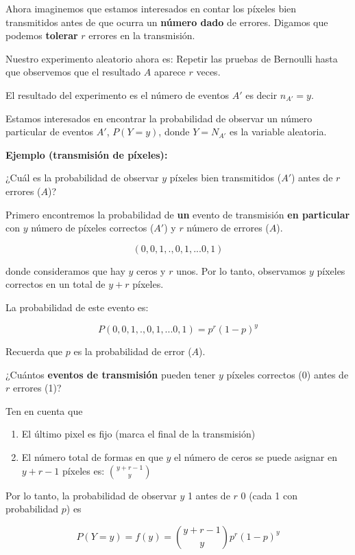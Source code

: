 \documentclass[
]{book}
\begin{document}
Ahora imaginemos que estamos interesados en contar los píxeles bien transmitidos antes de que ocurra un \textbf{número dado} de errores. Digamos que podemos \textbf{tolerar} \(r\) errores en la transmisión.

Nuestro experimento aleatorio ahora es: Repetir las pruebas de Bernoulli hasta que observemos que el resultado \(A\) aparece \(r\) veces.

El resultado del experimento es el número de eventos \(A'\) es decir \(n_{A'}=y\).

Estamos interesados en encontrar la probabilidad de observar un número particular de eventos \(A'\), \(P(Y=y)\), donde \(Y=N_{A'}\) es la variable aleatoria.

\textbf{Ejemplo (transmisión de píxeles):}

¿Cuál es la probabilidad de observar \(y\) píxeles bien transmitidos (\(A'\)) antes de \(r\) errores (\(A\))?

Primero encontremos la probabilidad de \textbf{un} evento de transmisión \textbf{en particular} con \(y\) número de píxeles correctos (\(A'\)) y \(r\) número de errores (\(A\)).

\[(0,0,1,., 0,1,...0,1)\]

donde consideramos que hay \(y\) ceros y \(r\) unos. Por lo tanto, observamos \(y\) píxeles correctos en un total de \(y + r\) píxeles.

La probabilidad de este evento es:

\[P(0,0,1,., 0,1,...0,1)=p^r(1-p)^y\]

Recuerda que \(p\) es la probabilidad de error (\(A\)).

¿Cuántos \textbf{eventos de transmisión} pueden tener \(y\) píxeles correctos (0) antes de \(r\) errores (1)?

Ten en cuenta que

\begin{enumerate}
\def\labelenumi{\arabic{enumi})}
\item
  El último pixel es fijo (marca el final de la transmisión)
\item
  El número total de formas en que \(y\) el número de ceros se puede asignar en \(y + r-1\) píxeles es: \(\binom {y + r-1} y\)
\end{enumerate}

Por lo tanto, la probabilidad de observar \(y\) 1 antes de \(r\) 0 (cada 1 con probabilidad \(p\)) es

\[P(Y=y)=f(y)=\binom {y+r-1} yp^r(1-p)^y\]
\end{document}
